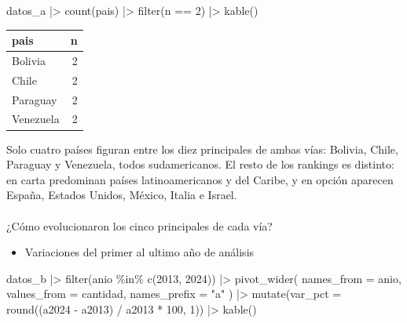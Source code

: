 \documentclass[
  letterpaper,
  DIV=11,
  numbers=noendperiod]{scrartcl}
\makeatletter
\let\oldparagraph\paragraph
\renewcommand{\paragraph}{
    \@ifstar
      \xxxParagraphStar
      \xxxParagraphNoStar
  }
\newcommand{\xxxParagraphStar}[1]{\oldparagraph*{#1}\mbox{}}
\newcommand{\xxxParagraphNoStar}[1]{\oldparagraph{#1}\mbox{}}
\newenvironment{Shaded}{\begin{snugshade}}{\end{snugshade}}
\newcommand{\AttributeTok}[1]{\textcolor[rgb]{0.40,0.45,0.13}{#1}}
\newcommand{\DecValTok}[1]{\textcolor[rgb]{0.68,0.00,0.00}{#1}}
\newcommand{\FunctionTok}[1]{\textcolor[rgb]{0.28,0.35,0.67}{#1}}
\newcommand{\NormalTok}[1]{\textcolor[rgb]{0.00,0.23,0.31}{#1}}
\newcommand{\SpecialCharTok}[1]{\textcolor[rgb]{0.37,0.37,0.37}{#1}}
\newcommand{\StringTok}[1]{\textcolor[rgb]{0.13,0.47,0.30}{#1}}
\providecommand{\tightlist}{%
  \setlength{\itemsep}{0pt}\setlength{\parskip}{0pt}}\usepackage{longtable,booktabs,array}
\makeatother
\begin{document}
\begin{Shaded}
\begin{Highlighting}[]
\NormalTok{datos\_a }\SpecialCharTok{|\textgreater{}}
  \FunctionTok{count}\NormalTok{(pais) }\SpecialCharTok{|\textgreater{}}
  \FunctionTok{filter}\NormalTok{(n }\SpecialCharTok{==} \DecValTok{2}\NormalTok{) }\SpecialCharTok{|\textgreater{}} 
  \FunctionTok{kable}\NormalTok{()}
\end{Highlighting}
\end{Shaded}

\begin{longtable}[]{@{}lr@{}}
\toprule\noalign{}
pais & n \\
\midrule\noalign{}
\endhead
\bottomrule\noalign{}
\endlastfoot
Bolivia & 2 \\
Chile & 2 \\
Paraguay & 2 \\
Venezuela & 2 \\
\end{longtable}

Solo cuatro países figuran entre los diez principales de ambas vías:
Bolivia, Chile, Paraguay y Venezuela, todos sudamericanos. El resto de
los rankings es distinto: en carta predominan países latinoamericanos y
del Caribe, y en opción aparecen España, Estados Unidos, México, Italia
e Israel.

\paragraph{¿Cómo evolucionaron los cinco principales de cada
vía?}\label{cuxf3mo-evolucionaron-los-cinco-principales-de-cada-vuxeda}

\begin{itemize}
\tightlist
\item
  Variaciones del primer al ultimo año de análisis
\end{itemize}

\begin{Shaded}
\begin{Highlighting}[]
\NormalTok{datos\_b }\SpecialCharTok{|\textgreater{}}
  \FunctionTok{filter}\NormalTok{(anio }\SpecialCharTok{\%in\%} \FunctionTok{c}\NormalTok{(}\DecValTok{2013}\NormalTok{, }\DecValTok{2024}\NormalTok{)) }\SpecialCharTok{|\textgreater{}}
  \FunctionTok{pivot\_wider}\NormalTok{(}
    \AttributeTok{names\_from =}\NormalTok{ anio,}
    \AttributeTok{values\_from =}\NormalTok{ cantidad,}
    \AttributeTok{names\_prefix =} \StringTok{"a"}
\NormalTok{  ) }\SpecialCharTok{|\textgreater{}}
  \FunctionTok{mutate}\NormalTok{(}\AttributeTok{var\_pct =} \FunctionTok{round}\NormalTok{((a2024 }\SpecialCharTok{{-}}\NormalTok{ a2013) }\SpecialCharTok{/}\NormalTok{ a2013 }\SpecialCharTok{*} \DecValTok{100}\NormalTok{, }\DecValTok{1}\NormalTok{)) }\SpecialCharTok{|\textgreater{}} 
  \FunctionTok{kable}\NormalTok{()}
\end{Highlighting}
\end{Shaded}
\end{document}
